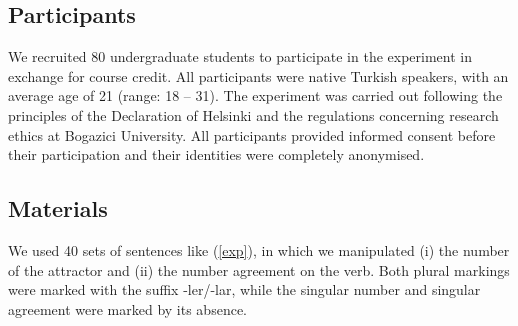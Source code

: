 \documentclass[
  authoryear,
  preprint]{elsarticle}
\begin{document}
\subsection{Participants}\label{participants}

We recruited 80 undergraduate students to participate in the experiment
in exchange for course credit. All participants were native Turkish
speakers, with an average age of 21 (range: 18 -- 31). The experiment
was carried out following the principles of the Declaration of Helsinki
and the regulations concerning research ethics at Bogazici University.
All participants provided informed consent before their participation
and their identities were completely anonymised.

\subsection{Materials}\label{materials}

We used 40 sets of sentences like (\ref{exp}), in which we manipulated
(i) the number of the attractor and (ii) the number agreement on the
verb. Both plural markings were marked with the suffix -ler/-lar, while
the singular number and singular agreement were marked by its absence.

\begin{exe}
\ex \label{exp}
\begin{xlist}
\end{xlist}
\end{exe}
\end{document}
